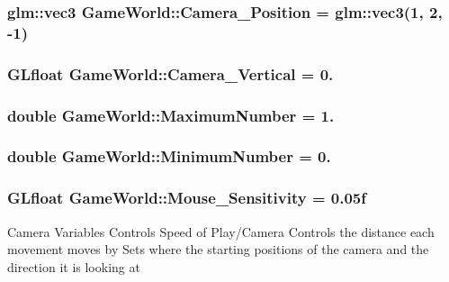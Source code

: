 \subsubsection[{Camera\+\_\+\+Position}]{\setlength{\rightskip}{0pt plus 5cm}glm\+::vec3 Game\+World\+::\+Camera\+\_\+\+Position = glm\+::vec3(1, 2, -\/1)}\label{classGameWorld_ad80e597474ea4c52a583e81788187571}
\hypertarget{classGameWorld_a26658e739c4d267b1be35ed820089931}{}
\subsubsection[{Camera\+\_\+\+Vertical}]{\setlength{\rightskip}{0pt plus 5cm}G\+Lfloat Game\+World\+::\+Camera\+\_\+\+Vertical = 0.}\label{classGameWorld_a26658e739c4d267b1be35ed820089931}
\hypertarget{classGameWorld_a1cddcf233625a98581eaeb9fd7c8c574}{}
\subsubsection[{Maximum\+Number}]{\setlength{\rightskip}{0pt plus 5cm}double Game\+World\+::\+Maximum\+Number = 1.}\label{classGameWorld_a1cddcf233625a98581eaeb9fd7c8c574}
\hypertarget{classGameWorld_a54ccf4cf03172ab8779e9c326c8846ed}{}
\subsubsection[{Minimum\+Number}]{\setlength{\rightskip}{0pt plus 5cm}double Game\+World\+::\+Minimum\+Number = 0.}\label{classGameWorld_a54ccf4cf03172ab8779e9c326c8846ed}
\hypertarget{classGameWorld_a9bf4eb977e6ab9299aaef1345c4fa4dd}{}
\subsubsection[{Mouse\+\_\+\+Sensitivity}]{\setlength{\rightskip}{0pt plus 5cm}G\+Lfloat Game\+World\+::\+Mouse\+\_\+\+Sensitivity = 0.\+05f}\label{classGameWorld_a9bf4eb977e6ab9299aaef1345c4fa4dd}
Camera Variables Controls Speed of Play/\+Camera Controls the distance each movement moves by Sets where the starting positions of the camera and the direction it is looking at \hypertarget{classGameWorld_a968eb29424b68f7cd79a5896c62e944d}{}
